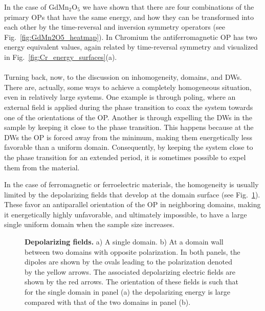 In the case of GdMn$_2$O$_5$ we have shown that there are four combinations of the primary OPs that have the same energy, and how they can be transformed into each other by the time-reversal and inversion symmetry operators (see Fig.~\ref{fig:GdMn2O5_heatmap}). 
In Chromium the antiferromagnetic OP has two energy equivalent values, again related by time-reversal symmetry and visualized in Fig.~\ref{fig:Cr_energy_surfaces}(a).
\\\\
Turning back, now, to the discussion on inhomogeneity, domains, and DWs.
There are, actually, some ways to achieve a completely homogeneous situation, even in relatively large systems.
One example is through poling, where an external field is applied during the phase transition to coax the system towards one of the orientations of the OP.
Another is through expelling the DWs in the sample by keeping it close to the phase transition.
This happens because at the DWs the OP is forced away from the minimum, making them energetically less favorable than a uniform domain.
Consequently, by keeping the system close to the phase transition for an extended period, it is sometimes possible to expel them from the material.

In the case of ferromagnetic or ferroelectric materials, the homogeneity is usually limited by the depolarizing fields that develop at the domain surface (see Fig.~\ref{fig:BTO_depolarizing_schematic}).
These favor an antiparallel orientation of the OP in neighboring domains, making it energetically highly unfavorable, and ultimately impossible, to have a large single uniform domain when the sample size increases.
\begin{figure}[h]
	\caption{\label{fig:BTO_depolarizing_schematic}{\bf Depolarizing fields.} a) A single domain. b) At a domain wall between two domains with opposite polarization. In both panels, the dipoles are shown by the ovals leading to the polarization denoted by the yellow arrows. The associated depolarizing electric fields are shown by the red arrows. The orientation of these fields is such that for the single domain in panel (a) the depolarizing energy is large compared with that of the two domains in panel (b).}    
\end{figure}

